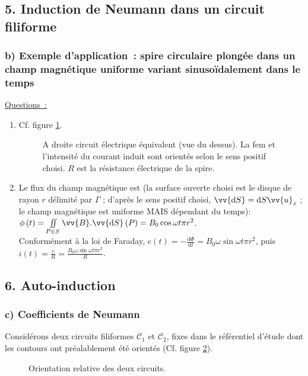 \documentclass{article}
\let\oldiint\iint
\renewcommand{\iint}{\oldiint\limits}
\renewcommand\overrightarrow{\vv}
\begin{document}
\subsection*{5. Induction de Neumann dans un circuit filiforme}
\subsubsection*{b) Exemple d'application : spire circulaire plongée dans un
champ magnétique uniforme variant sinusoïdalement dans le temps}
\underline{Questions :}
\begin{enumerate}
\item Cf. figure \ref{Fig.2}.

\begin{figure}[h]
\begin{center}
\end{center}
\caption{A droite circuit électrique équivalent (vue du dessus). La
fem et l'intensité du courant induit sont orientés selon le sens
positif choisi. $R$ est la résistance électrique de la
spire.}\label{Fig.2}
\end{figure}


\item Le flux du champ magnétique est (la surface ouverte choisi est le disque de rayon $r$ délimité par $\Gamma$ ; d'après le sens positif
choisi, $\overrightarrow{\mathrm{d}S}=\mathrm{d}S\overrightarrow{u}_{z}$ ; le champ
magnétique est uniforme MAIS dépendant du temps): $\phi\left(t\right) =
\iint_{P\in S} \overrightarrow{B}.\overrightarrow{\mathrm{d}S}\left(P\right) = B_{0}\cos
\omega t \pi r^{2}$. \\
Conformément à la loi de Faraday, $e\left(t\right) = -\frac{\mathrm{d}\Phi}{\mathrm{d}t} =
B_{0}\omega \sin\omega t \pi r^{2}$, puis $i\left(t\right) = \frac{e}{R} =
\frac{B_{0}\omega \sin\omega t \pi r^{2}}{R}$.
\end{enumerate}

\subsection*{6. Auto-induction}
\subsubsection*{c) Coefficients de Neumann}
Considérons deux circuits filiformes $\mathcal{C}_{1}$ et
$\mathcal{C}_{2}$, fixes dans le référentiel d'étude dont les
contours ont préalablement été orientés (Cf. figure \ref{Fig.3}).
\begin{figure}[h]
\begin{center}
\end{center}
\caption{Orientation relative des deux circuits.}\label{Fig.3}
\end{figure}
\end{document}
